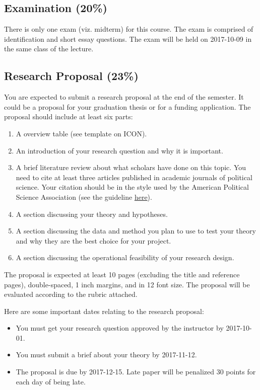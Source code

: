 \documentclass[11pt,]{article}
\providecommand{\tightlist}{%
  \setlength{\itemsep}{0pt}\setlength{\parskip}{0pt}}
\theoremstyle{definition}
\theoremstyle{definition}
\theoremstyle{remark}
\begin{document}
\subsection{Examination (20\%)}\label{examination-20}

There is only one exam (viz. midterm) for this course. The exam is
comprised of identification and short essay questions. The exam will be
held on 2017-10-09 in the same class of the lecture.

\subsection{Research Proposal (23\%)}\label{research-proposal-23}

You are expected to submit a research proposal at the end of the
semester. It could be a proposal for your graduation thesis or for a
funding application. The proposal should include at least six parts:

\begin{enumerate}
\def\labelenumi{\arabic{enumi}.}
\tightlist
\item
  A overview table (see template on ICON).
\item
  An introduction of your research question and why it is important.
\item
  A brief literature review about what scholars have done on this topic.
  You need to cite at least three articles published in academic
  journals of political science. Your citation should be in the style
  used by the American Political Science Association (see the guideline
  \href{http://www.apsanet.org/portals/54/Files/Publications/APSAStyleManual2006.pdf}{here}).
\item
  A section discussing your theory and hypotheses.
\item
  A section discussing the data and method you plan to use to test your
  theory and why they are the best choice for your project.
\item
  A section discussing the operational feasibility of your research
  design.
\end{enumerate}

The proposal is expected at least 10 pages (excluding the title and
reference pages), double-spaced, 1 inch margins, and in 12 font size.
The proposal will be evaluated according to the rubric attached.

Here are some important dates relating to the research proposal:

\begin{itemize}
\tightlist
\item
  You must get your research question approved by the instructor by
  2017-10-01.
\item
  You must submit a brief about your theory by 2017-11-12.
\item
  The proposal is due by 2017-12-15. Late paper will be penalized 30
  points for each day of being late.
\end{itemize}
\end{document}

